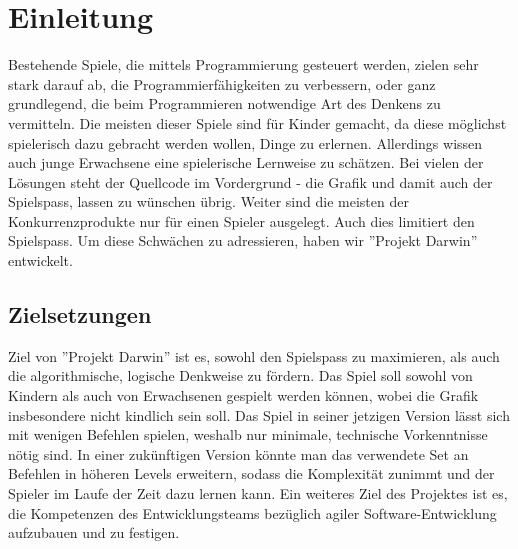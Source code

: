 \documentclass[11pt,a4paper,titlepage]{article}
\begin{document}

\newpage

\pagestyle{myheadings}

\section{Einleitung}


Bestehende Spiele, die mittels Programmierung gesteuert werden, zielen sehr stark darauf ab, die Programmierfähigkeiten zu verbessern, oder ganz grundlegend, die beim Programmieren notwendige Art des Denkens zu vermitteln.
Die meisten dieser Spiele sind für Kinder gemacht, da diese möglichst spielerisch dazu gebracht werden wollen, Dinge zu erlernen. Allerdings wissen auch junge Erwachsene eine spielerische Lernweise zu schätzen.
Bei vielen der Lösungen steht der Quellcode im Vordergrund - die Grafik und damit auch der Spielspass, lassen zu wünschen übrig.
Weiter sind die meisten der Konkurrenzprodukte nur für einen Spieler ausgelegt. Auch dies limitiert den Spielspass.
Um diese Schwächen zu adressieren, haben wir ''Projekt Darwin'' entwickelt.

\subsection{Zielsetzungen}



Ziel von ''Projekt Darwin'' ist es, sowohl den Spielspass zu maximieren, als auch die algorithmische, logische Denkweise zu fördern. Das Spiel soll sowohl von Kindern als auch von Erwachsenen gespielt werden können, wobei die Grafik insbesondere nicht kindlich sein soll.
Das Spiel in seiner jetzigen Version lässt sich mit wenigen Befehlen spielen, weshalb nur minimale, technische Vorkenntnisse nötig sind.
In einer zukünftigen Version könnte man das verwendete Set an Befehlen in höheren Levels erweitern, sodass die Komplexität zunimmt und der Spieler im Laufe der Zeit dazu lernen kann.
Ein weiteres Ziel des Projektes ist es, die Kompetenzen des Entwicklungsteams bezüglich agiler Software-Entwicklung aufzubauen und zu festigen.
\end{document}
